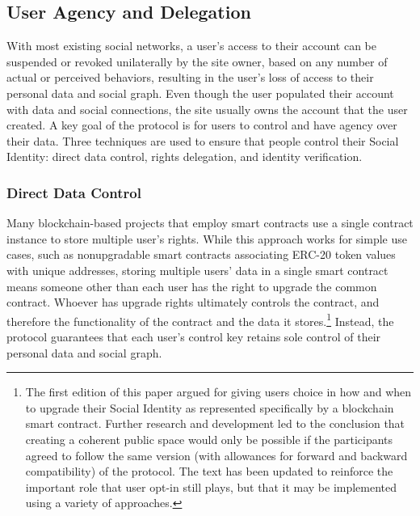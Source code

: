 \documentclass[12pt,letterpaper]{article}
\begin{document}
\subsection{User Agency and Delegation}\label{sec:user_ownership and_delegation}

With most existing social networks, a user's access to their account can be suspended or
revoked unilaterally by the site owner, based on any number of actual or perceived
behaviors, resulting in the user's loss of access to their personal data and social graph.
Even though the user populated their account with data and social connections, the site
usually owns the account that the user created. A key goal of the protocol is for users to
control and have agency over their data. Three techniques are used to ensure that people control
their Social Identity: direct data control, rights delegation, and identity verification.

\subsubsection{Direct Data Control}

Many blockchain-based projects that employ smart contracts use a single contract instance to
store multiple user's rights. While this approach works for simple use cases, such
as nonupgradable smart contracts associating ERC-20\cite{erc20} token values with unique
addresses, storing multiple users' data in a single smart contract means someone other than
each user has the right to upgrade the common contract. Whoever has upgrade rights
ultimately controls the contract, and therefore the functionality of the contract and the
data it stores.\footnote{The first edition of this paper argued for giving users choice in
  how and when to upgrade their Social Identity as represented specifically by a blockchain
  smart contract. Further research and development led to the conclusion that creating a
  coherent public space would only be possible if the participants agreed to follow the same
  version (with allowances for forward and backward compatibility) of the protocol. The text
  has been updated to reinforce the important role that user opt-in still plays, but that it
  may be implemented using a variety of approaches.} Instead, the protocol guarantees that
each user's control key retains sole control of their personal data and social graph.
\end{document}
